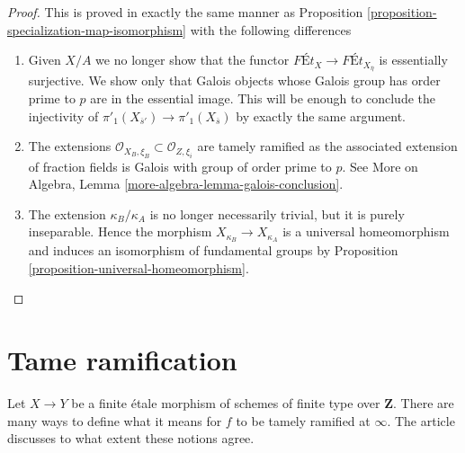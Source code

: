 \documentclass{stacks-project}
\theoremstyle{plain}
\theoremstyle{definition}
\theoremstyle{remark}
\numberwithin{equation}{subsection}
\begin{document}
\begin{proof}
This is proved in exactly the same manner as
Proposition \ref{proposition-specialization-map-isomorphism}
with the following differences
\begin{enumerate}
\item Given $X/A$ we no longer show that the functor
$\textit{F\'Et}_X \to \textit{F\'Et}_{X_{\overline{\eta}}}$
is essentially surjective. We show only that Galois objects
whose Galois group has order prime to $p$ are in the essential
image. This will be enough to conclude the injectivity of
$\pi'_1(X_{\overline{s}'}) \to \pi'_1(X_{\overline{s}})$ by
exactly the same argument.
\item The extensions
$\mathcal{O}_{X_B, \xi_B} \subset \mathcal{O}_{Z, \xi_i}$
are tamely ramified as the associated extension of fraction
fields is Galois with group of order prime to $p$. See
More on Algebra, Lemma \ref{more-algebra-lemma-galois-conclusion}.
\item The extension $\kappa_B/\kappa_A$ is no longer
necessarily trivial, but it is purely inseparable.
Hence the morphism $X_{\kappa_B} \to X_{\kappa_A}$
is a universal homeomorphism and induces an isomorphism
of fundamental groups by Proposition \ref{proposition-universal-homeomorphism}.
\end{enumerate}
\end{proof}













\section{Tame ramification}
\label{section-tame}

\noindent
Let $X \to Y$ be a finite \'etale morphism of schemes of finite type
over $\mathbf{Z}$. There are many ways to define what it means for $f$
to be tamely ramified at $\infty$. The article \cite{Kerz-Schmidt}
discusses to what extent these notions agree.
\end{document}
